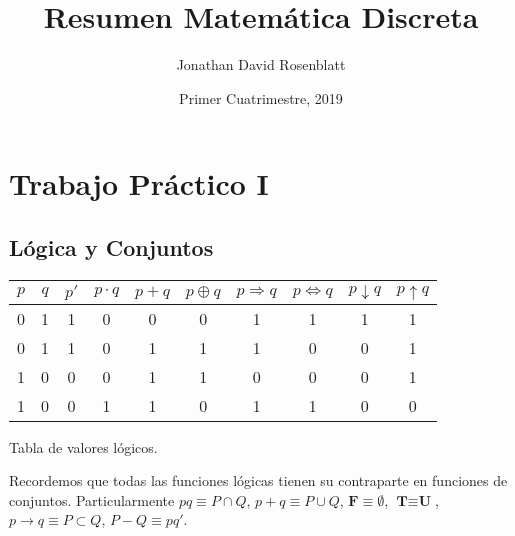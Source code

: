 \documentclass[titlepage,a4paper,12pt,twoside]{article}
\title{Resumen Matemática Discreta}
\author{ Jonathan David Rosenblatt }
\date{ Primer Cuatrimestre, 2019 }
\begin{document}
\maketitle

\newpage
\tableofcontents 

\newpage

\maketitle

\section{Trabajo Práctico I}

\subsection{Lógica y Conjuntos}

\begin{table}[htbp]
\centering
\begin{tabular}{|r|c|c|c|c|c|c|c|c|c|}
\hline
 $p$ & $q$ & $p'$ & $p\cdot q$  & $p+q$ & $p\oplus q$ & $p\Rightarrow q$  & $p\Leftrightarrow q$ & $p\downarrow q$ & $p\uparrow q$ \\
\hline
0 & 1 & 1 & 0 & 0 & 0 & 1 & 1 & 1 & 1 \\
0 & 1 & 1 & 0 & 1 & 1 & 1 & 0 & 0 & 1 \\
1 & 0 & 0 & 0 & 1 & 1 & 0 & 0 & 0 & 1 \\
1 & 0 & 0 & 1 & 1 & 0 & 1 & 1 & 0 & 0 \\

\hline
\end{tabular}
\begin{center}
Tabla de valores lógicos.
\end{center}
\label{tabla}
\end{table}

Recordemos que todas las funciones lógicas tienen su contraparte en funciones de conjuntos. Particularmente $pq \equiv P \cap Q $, $p + q \equiv P \cup Q $, $\textbf{F} \equiv \emptyset $, $\textbf{T} \equiv \textbf{U} $, $p \rightarrow q \equiv P \subset Q $, $ P - Q \equiv pq'.$\\
\end{document}
